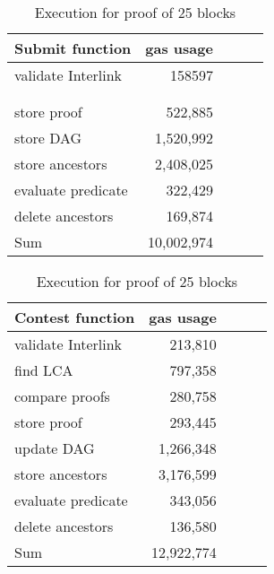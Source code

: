 \begin{table}[H]
    \centering
    \begin{tabular}{@{}lccll@{}}
        \toprule
        \multicolumn{1}{c}{\textbf{Submit function}} & \textbf{gas usage}    \\ \midrule
        validate Interlink  & \multicolumn{1}{r}{ 158597} \\
        \\
        \\
        store proof         & \multicolumn{1}{r}{   522,885} \\
        store DAG           & \multicolumn{1}{r}{ 1,520,992}\\
        store ancestors     & \multicolumn{1}{r}{ 2,408,025}\\
        evaluate predicate  & \multicolumn{1}{r}{   322,429} \\
        delete ancestors    & \multicolumn{1}{r}{   169,874} \\
        \midrule
        Sum                 & \multicolumn{1}{r}{10,002,974}\\
        \bottomrule
    \end{tabular}
    \quad
    \begin{tabular}{@{}lccll@{}}
        \toprule
        \multicolumn{1}{c}{\textbf{Contest function}} & \textbf{gas usage}    \\ \midrule
        validate Interlink  & \multicolumn{1}{r}{   213,810}\\
        find LCA            & \multicolumn{1}{r}{   797,358} \\
        compare proofs      & \multicolumn{1}{r}{   280,758} \\
        store proof         & \multicolumn{1}{r}{   293,445} \\
        update DAG          & \multicolumn{1}{r}{ 1,266,348} \\
        store ancestors     & \multicolumn{1}{r}{ 3,176,599} \\
        evaluate predicate  & \multicolumn{1}{r}{   343,056} \\
        delete ancestors    & \multicolumn{1}{r}{   136,580} \\
        \midrule
        Sum                 & \multicolumn{1}{r}{12,922,774}\\
        \bottomrule
    \end{tabular}
    \caption{Execution for proof of 25 blocks}
    \label{table:old_gas_usage}
\end{table}
